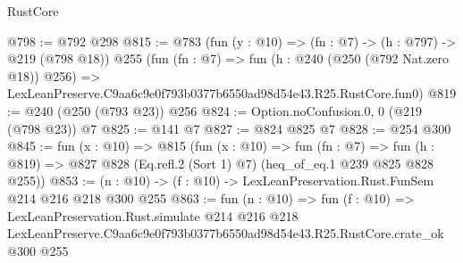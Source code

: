 \begin{lexlean}{RustCore}
\begin{coremodule}
@798 := @792 @298
@815 := @783
    (fun (y : @10) => (fn : @7) -> (h : @797) -> @219 (@798 @18))
    @255
    (fun (fn : @7) =>
    fun (h : @240 (@250 (@792 Nat.zero @18)) @256) =>
    LexLeanPreserve.C9aa6c9e0f793b0377b6550ad98d54e43.R25.RustCore.fun0)
@819 := @240 (@250 (@793 @23)) @256
@824 := Option.noConfusion.{0, 0} (@219 (@798 @23)) @7
@825 := @141 @7
@827 := @824 @825 @7
@828 := @254 @300
@845 := fun (x : @10) =>
  @815
    (fun (x : @10) =>
    fun (fn : @7) =>
    fun (h : @819) => @827 @828 (Eq.refl.{2} (Sort 1) @7) (heq_of_eq.{1} @239 @825 @828 @255))
@853 := (n : @10) -> (f : @10) -> LexLeanPreservation.Rust.FunSem @214 @216 @218 @300 @255
@863 := fun (n : @10) =>
  fun (f : @10) =>
  LexLeanPreservation.Rust.simulate
    @214
    @216
    @218
    LexLeanPreserve.C9aa6c9e0f793b0377b6550ad98d54e43.R25.RustCore.crate_ok
    @300
    @255
\end{coremodule}
\end{lexlean}
